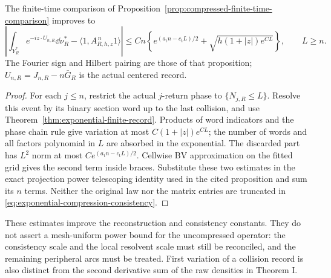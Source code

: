 \begin{proposition}
\label{prop:exponential-compression-consistency}
The finite-time comparison of
Proposition~\ref{prop:compressed-finite-time-comparison} improves to
\begin{equation}\label{eq:exponential-compression-consistency}
 \left|\int_{Y_R^*}e^{-iz\cdot U_{n,R}}\dd\nu_R^*
                       -\langle1,A_{R,h,z}^{\,n}1\rangle\right|
 \le Cn\left\{e^{(a_{\mathrm t}n-c_{\mathrm t}L)/2}
          +\sqrt{h(1+|z|)e^{CL}}\right\},\qquad L\ge n.
\end{equation}
The Fourier sign and Hilbert pairing are those of that proposition;
$U_{n,R}=J_{n,R}-n\bar G_R$ is the actual centered record.
\end{proposition}
\begin{proof}
For each $j\le n$, restrict the actual $j$-return phase to
$\{N_{j,R}\le L\}$. Resolve this event by its binary section word
up to the last collision, and use
Theorem~\ref{thm:exponential-finite-record}. Products of word indicators
and the phase chain rule give variation at most
$C(1+|z|)e^{CL}$; the number of words and all factors polynomial in
$L$ are absorbed in the exponential. The discarded part has $L^2$
norm at most $Ce^{(a_{\mathrm t}n-c_{\mathrm t}L)/2}$.
Cellwise BV approximation on the fitted grid gives the second term
inside braces. Substitute these two estimates in the exact projection
power telescoping identity used in the cited proposition and sum
its $n$ terms. Neither the original law nor the matrix entries are
truncated in \eqref{eq:exponential-compression-consistency}.
\end{proof}

These estimates improve the reconstruction and consistency constants.
They do not assert a mesh-uniform power bound for the uncompressed
operator: the consistency scale and the local resolvent scale must
still be reconciled, and the remaining peripheral arcs must be treated.
First variation of a collision record is also distinct from the
second derivative sum of the raw densities in Theorem I.
